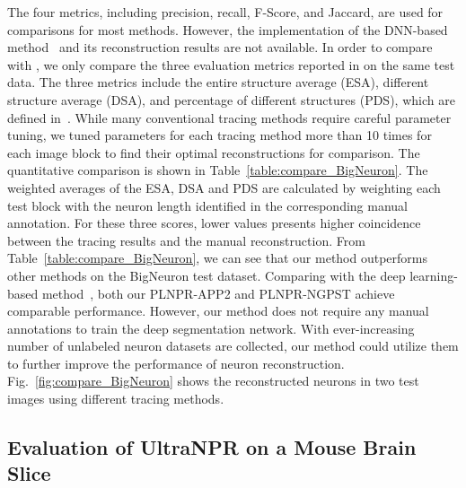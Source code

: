 The four metrics, including precision, recall, F-Score, and Jaccard, are used for comparisons for most methods.
However, the implementation of the DNN-based method~\cite{Li2017} and its reconstruction results are not available.
In order to compare with \cite{Li2017}, we only compare the three evaluation metrics reported in \cite{Li2017} on the same test data.
%
The three metrics include the entire structure average (ESA), different structure average (DSA), and percentage of different structures (PDS), which are defined in~\cite{Peng2010a}.
While many conventional tracing methods require careful parameter tuning, we tuned parameters for each tracing method more than 10 times for each image block to find their optimal reconstructions for comparison.
%
The quantitative comparison is shown in Table~\ref{table:compare_BigNeuron}.
The weighted averages of the ESA, DSA and PDS are calculated by weighting each test block with the neuron length identified in the corresponding manual annotation.
For these three scores, lower values presents higher coincidence between the tracing results and the manual reconstruction.
%
From Table~\ref{table:compare_BigNeuron}, we can see that our method outperforms other methods on the BigNeuron test dataset.
%
Comparing with the deep learning-based method~\cite{Li2017}, both our PLNPR-APP2 and PLNPR-NGPST achieve comparable performance.
However, our method does not require any manual annotations to train the deep segmentation network.
With ever-increasing number of unlabeled neuron datasets are collected, our method could utilize them to further improve the performance of neuron reconstruction.
%
Fig.~\ref{fig:compare_BigNeuron} shows the reconstructed neurons in two test images using different tracing methods. 


\subsection{Evaluation of UltraNPR on a Mouse Brain Slice}
\label{sec:exp_UltraNPR}

